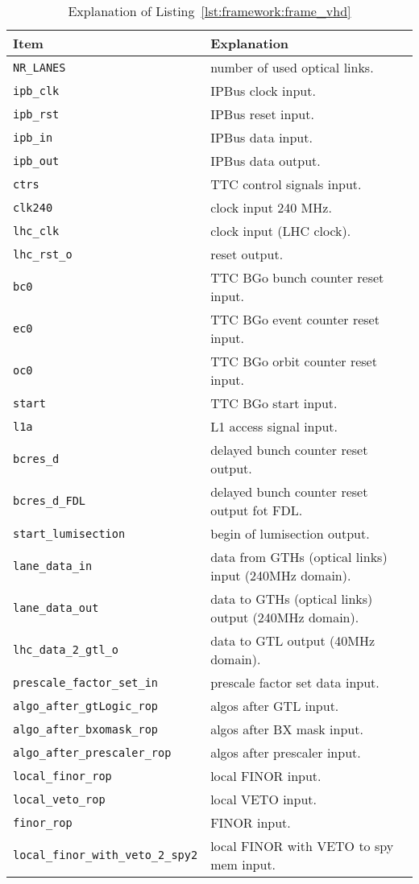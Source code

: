 \medskip
\begin{table}
\footnotesize
\caption{Explanation of Listing~\ref{lst:framework:frame_vhd}}
\vspace{5mm}
\centering
\begin{tabular}{l p{}}
\toprule
{Item} & {Explanation}\\
\midrule
\verb|NR_LANES| & number of used optical links.\\
\verb|ipb_clk| & IPBus clock input.\\
\verb|ipb_rst| & IPBus reset input.\\
\verb|ipb_in| & IPBus data input.\\
\verb|ipb_out| & IPBus data output.\\
\verb|ctrs| & TTC control signals input.\\
\verb|clk240| & clock input 240 MHz.\\
\verb|lhc_clk| & clock input (LHC clock).\\
\verb|lhc_rst_o| & reset output.\\
\verb|bc0| & TTC BGo bunch counter reset input.\\
\verb|ec0| & TTC BGo event counter reset input.\\
\verb|oc0| & TTC BGo orbit counter reset input.\\
\verb|start| & TTC BGo start input.\\
\verb|l1a| & L1 access signal input.\\
\verb|bcres_d| & delayed bunch counter reset output.\\
\verb|bcres_d_FDL| & delayed bunch counter reset output fot FDL.\\
\verb|start_lumisection| & begin of lumisection output.\\
\verb|lane_data_in| & data from GTHs (optical links) input (240MHz domain).\\
\verb|lane_data_out| & data to GTHs (optical links) output (240MHz domain).\\
\verb|lhc_data_2_gtl_o| & data to GTL output (40MHz domain).\\
\verb|prescale_factor_set_in| & prescale factor set data input.\\
\verb|algo_after_gtLogic_rop| & algos after GTL input.\\
\verb|algo_after_bxomask_rop| & algos after BX mask input.\\
\verb|algo_after_prescaler_rop| & algos after prescaler input.\\
\verb|local_finor_rop| & local FINOR input.\\
\verb|local_veto_rop| & local VETO input.\\
\verb|finor_rop| & FINOR input.\\
\verb|local_finor_with_veto_2_spy2| & local FINOR with VETO to spy mem input.\\
\bottomrule
\end{tabular}
\label{tab:framework:explanation_frame_vhd}
\end{table}

